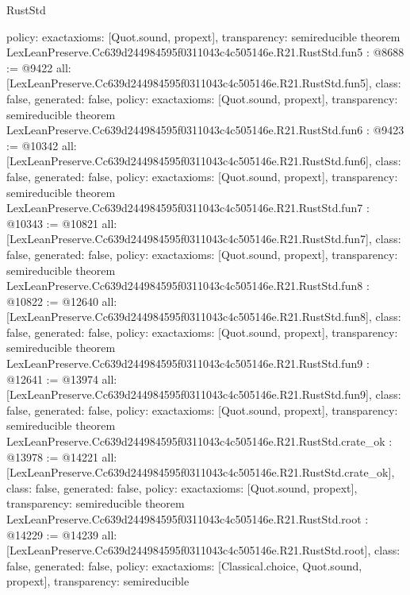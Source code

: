 \begin{lexlean}{RustStd}
\begin{coremodule}
{  policy: exact{axioms: [Quot.sound, propext]},
  transparency: semireducible
}
theorem LexLeanPreserve.Cc639d244984595f0311043c4c505146e.R21.RustStd.fun5 : @8688 := @9422 {
  all: [LexLeanPreserve.Cc639d244984595f0311043c4c505146e.R21.RustStd.fun5],
  class: false,
  generated: false,
  policy: exact{axioms: [Quot.sound, propext]},
  transparency: semireducible
}
theorem LexLeanPreserve.Cc639d244984595f0311043c4c505146e.R21.RustStd.fun6 : @9423 := @10342 {
  all: [LexLeanPreserve.Cc639d244984595f0311043c4c505146e.R21.RustStd.fun6],
  class: false,
  generated: false,
  policy: exact{axioms: [Quot.sound, propext]},
  transparency: semireducible
}
theorem LexLeanPreserve.Cc639d244984595f0311043c4c505146e.R21.RustStd.fun7 : @10343 := @10821 {
  all: [LexLeanPreserve.Cc639d244984595f0311043c4c505146e.R21.RustStd.fun7],
  class: false,
  generated: false,
  policy: exact{axioms: [Quot.sound, propext]},
  transparency: semireducible
}
theorem LexLeanPreserve.Cc639d244984595f0311043c4c505146e.R21.RustStd.fun8 : @10822 := @12640 {
  all: [LexLeanPreserve.Cc639d244984595f0311043c4c505146e.R21.RustStd.fun8],
  class: false,
  generated: false,
  policy: exact{axioms: [Quot.sound, propext]},
  transparency: semireducible
}
theorem LexLeanPreserve.Cc639d244984595f0311043c4c505146e.R21.RustStd.fun9 : @12641 := @13974 {
  all: [LexLeanPreserve.Cc639d244984595f0311043c4c505146e.R21.RustStd.fun9],
  class: false,
  generated: false,
  policy: exact{axioms: [Quot.sound, propext]},
  transparency: semireducible
}
theorem LexLeanPreserve.Cc639d244984595f0311043c4c505146e.R21.RustStd.crate_ok : @13978 := @14221 {
  all: [LexLeanPreserve.Cc639d244984595f0311043c4c505146e.R21.RustStd.crate_ok],
  class: false,
  generated: false,
  policy: exact{axioms: [Quot.sound, propext]},
  transparency: semireducible
}
theorem LexLeanPreserve.Cc639d244984595f0311043c4c505146e.R21.RustStd.root : @14229 := @14239 {
  all: [LexLeanPreserve.Cc639d244984595f0311043c4c505146e.R21.RustStd.root],
  class: false,
  generated: false,
  policy: exact{axioms: [Classical.choice, Quot.sound, propext]},
  transparency: semireducible
}


\end{coremodule}
\end{lexlean}
